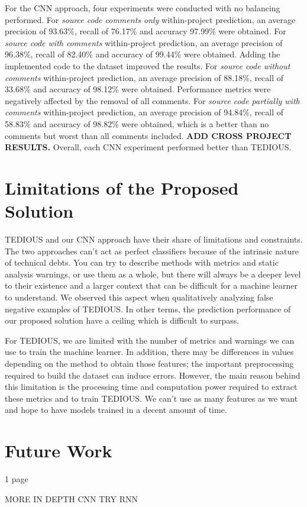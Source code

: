 For the CNN approach, four experiments were conducted with no balancing performed. For \textit{source code comments only} within-project prediction, an average precision of 93.63\%, recall of 76.17\% and accuracy 97.99\% were obtained. For \textit{source code with comments} within-project prediction, an average precision of 96.38\%, recall of 82.40\% and accuracy of 99.44\% were obtained. Adding the implemented code to the dataset improved the results. For \textit{source code without comments} within-project prediction, an average precision of 88.18\%, recall of 33.68\% and accuracy of 98.12\% were obtained. Performance metrics were negatively affected by the removal of all comments. For \textit{source code partially with comments} within-project prediction, an average precision of 94.84\%, recall of 58.83\% and accuracy of 98.82\% were obtained, which is a better than no comments but worst than all comments included. \textbf{ADD CROSS PROJECT RESULTS.} Overall, each CNN experiment performed better than TEDIOUS.

\section{Limitations of the Proposed Solution}\label{sec:Limitations}


TEDIOUS and our CNN approach have their share of limitations and constraints. The two approaches can't act as perfect classifiers because of the intrinsic nature of technical debts. You can try to describe methods with metrics and static analysis warnings, or use them as a whole, but there will always be a deeper level to their existence and a larger context that can be difficult for a machine learner to understand. We observed this aspect when qualitatively analyzing false negative examples of TEDIOUS. In other terms, the prediction performance of our proposed solution have a ceiling which is difficult to surpass.

For TEDIOUS, we are limited with the number of metrics and warnings we can use to train the machine learner. In addition, there may be differences in values depending on the method to obtain those features; the important preprocessing required to build the dataset can induce errors. However, the main reason behind this limitation is the processing time and computation power required to extract these metrics and to train TEDIOUS. We can't use as many features as we want and hope to have models trained in a decent amount of time.



\section{Future Work}

1 page

MORE IN DEPTH CNN
TRY RNN











